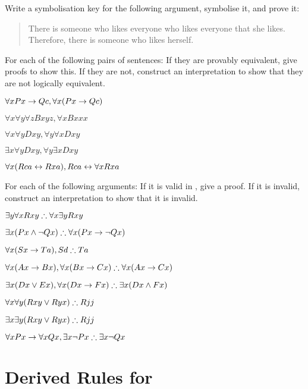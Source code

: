 \problempart
\label{pr.likes}
Write a symbolisation key for the following argument, symbolise it, and prove it:
\begin{quote}
There is someone who likes everyone who likes everyone that she likes. Therefore, there is someone who likes herself.
\end{quote}

\problempart
\label{pr.FOLequivornot}
For each of the following pairs of sentences: If they are provably equivalent, give proofs to show this. If they are not, construct an interpretation to show that they are not logically equivalent.
\begin{earg}
\item $\forall x Px \rightarrow Qc, \forall x (Px \rightarrow Qc)$
\item $\forall x\forall y \forall z Bxyz, \forall x Bxxx$
\item $\forall x\forall y Dxy, \forall y\forall x Dxy$
\item $\exists x\forall y Dxy, \forall y\exists x Dxy$
\item $\forall x (Rca \leftrightarrow Rxa), Rca \leftrightarrow \forall x Rxa$
\end{earg}

\problempart
\label{pr.FOLvalidornot}
For each of the following arguments: If it is valid in \FOL, give a proof. If it is invalid, construct an interpretation to show that it is invalid.
\begin{earg}
\item $\exists y\forall x Rxy \mathrel{\therefore} \forall x\exists y Rxy$
\item $\exists x(Px \wedge \neg Qx) \mathrel{\therefore} \forall x(Px \rightarrow \neg Qx)$
\item $\forall x(Sx \rightarrow Ta), Sd \mathrel{\therefore} Ta$
\item $\forall x(Ax\rightarrow Bx), \forall x(Bx \rightarrow Cx) \mathrel{\therefore} \forall x(Ax \rightarrow Cx)$
\item $\exists x(Dx \vee Ex), \forall x(Dx \rightarrow Fx) \mathrel{\therefore} \exists x(Dx \wedge Fx)$
\item $\forall x\forall y(Rxy \vee Ryx) \mathrel{\therefore} Rjj$
\item $\exists x\exists y(Rxy \vee Ryx) \mathrel{\therefore} Rjj$
\item $\forall x Px \rightarrow \forall x Qx, \exists x \neg Px \mathrel{\therefore} \exists x \neg Qx$
\end{earg}


\chapter{Derived Rules for \textnormal{\FOL}}\label{s:CQ}

